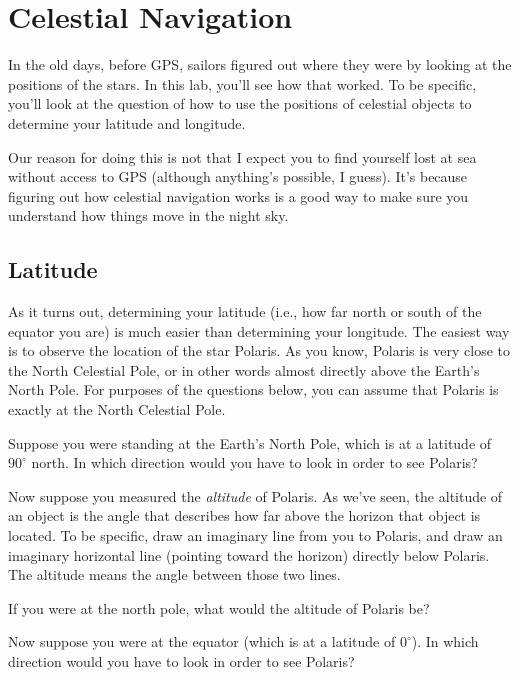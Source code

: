 \setcounter{chapter}{5}
\setcounter{page}{22}
\chapter{Celestial Navigation}

In the old days, before GPS, sailors figured out where they were
by looking at the positions of the stars. In this lab, you'll
see how that worked. To be specific, you'll look at the question
of how to use the positions of celestial 
objects to determine your latitude and longitude.

Our reason for doing this is not that I expect you to find yourself
lost at sea without access to GPS (although anything's possible,
I guess). It's because
figuring out how celestial navigation works is a good way to make
sure you understand how things move in the night sky.

\section*{Latitude}

As it turns out, determining your latitude (i.e., how far north or
south of the equator you are) is much easier than determining your longitude.
The easiest way is to observe the location of the star Polaris.
As you know, Polaris is very close to the North Celestial Pole, or in
other words almost directly above the Earth's North Pole. For
purposes of the questions below, you can assume that Polaris is
exactly at the North Celestial Pole.

Suppose you were standing at the Earth's North Pole, which is at a latitude
of $90^\circ$ north. In which direction would you have to look
in order to see Polaris?

\vskip 1in

Now suppose you measured the \textit{altitude} of Polaris. 
As we've seen, the 
altitude of an object is the angle that describes how far above
the horizon that object is located. To be specific, draw an imaginary
line from you to Polaris, and draw an imaginary horizontal line (pointing
toward the horizon) directly below Polaris. The altitude means
the angle between those two lines.

If you were at the north pole, what would the altitude of Polaris be?

\vskip 1in

Now suppose you were at the equator (which is at a latitude
of $0^\circ$). In which direction would you have to look in order to see
Polaris?

